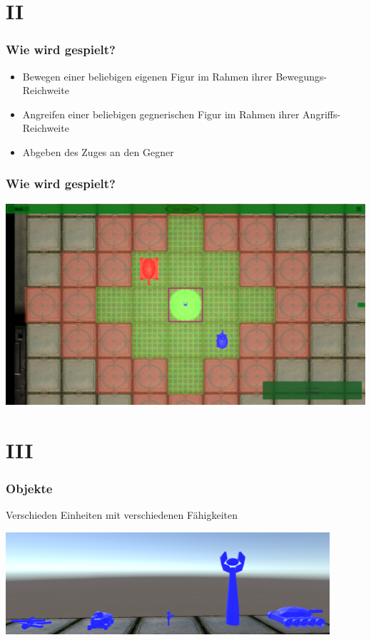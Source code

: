 ﻿\documentclass{beamer}
\begin{document}
\section{II}
\begin{frame} %
  \frametitle{Wie wird gespielt?} %
	
	\begin{itemize}
		\item Bewegen einer beliebigen eigenen Figur im Rahmen ihrer Bewegungs-Reichweite
		\item Angreifen einer beliebigen gegnerischen Figur im Rahmen ihrer Angriffs-Reichweite
		\item Abgeben des Zuges an den Gegner
	\end{itemize}
	
\end{frame}

\begin{frame} %
  \frametitle{Wie wird gespielt?} %
	
	\includegraphics[width=\textwidth]{Abbildungen/Ranges.PNG}
	
\end{frame}

\section{III}
\begin{frame} %
  \frametitle{Objekte} %
		Verschieden Einheiten mit verschiedenen Fähigkeiten
		
		\includegraphics[width=0.9\textwidth]{Abbildungen/Objects.PNG}
\end{frame}
\end{document}
